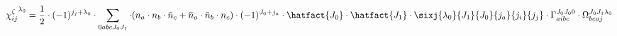 
\begin{dmath*}
{\chi^{\zeta}_{i j}}^{{{\lambda}}_{0}} = \frac{1}{2} \cdot (-1)^{{j}_{j}+{{\lambda}}_{0}} \cdot \sum_{0 a b c {J}_{0} {J}_{1}} \cdot (n_{a} \cdot n_{b} \cdot \bar{n}_{c} + \bar{n}_{a} \cdot \bar{n}_{b} \cdot n_{c}) \cdot (-1)^{{J}_{0}+{j}_{a}} \cdot \hatfact{{J}_{0}} \cdot \hatfact{{J}_{1}} \cdot \sixj{{{\lambda}}_{0}}{{J}_{1}}{{J}_{0}}{{j}_{a}}{{j}_{i}}{{j}_{j}} \cdot \Gamma_{a i b c}^{{J}_{0} {J}_{0} 0} \cdot \Omega_{b c a j}^{{J}_{0} {J}_{1} {{\lambda}}_{0}}
\end{dmath*}

